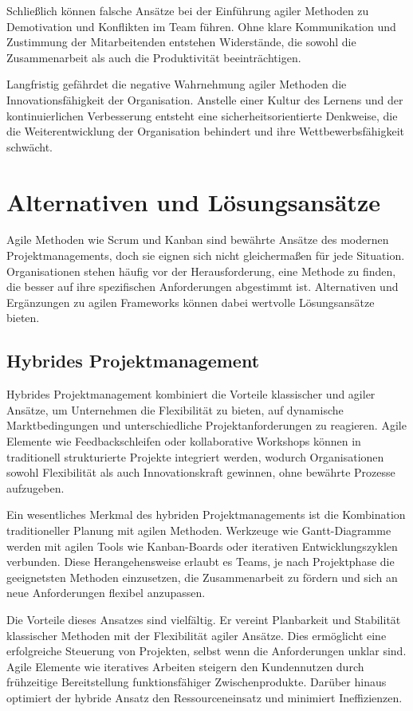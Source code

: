 \documentclass[ngerman]{seminarvorlage}
\begin{document}
Schließlich können falsche Ansätze bei der Einführung agiler Methoden zu Demotivation und Konflikten im Team führen. Ohne klare Kommunikation und Zustimmung der Mitarbeitenden entstehen Widerstände, die sowohl die Zusammenarbeit als auch die Produktivität beeinträchtigen.

Langfristig gefährdet die negative Wahrnehmung agiler Methoden die Innovationsfähigkeit der Organisation. Anstelle einer Kultur des Lernens und der kontinuierlichen Verbesserung entsteht eine sicherheitsorientierte Denkweise, die die Weiterentwicklung der Organisation behindert und ihre Wettbewerbsfähigkeit schwächt.
\cite{stawicki_10_2021}

\section{Alternativen und Lösungsansätze}
Agile Methoden wie Scrum und Kanban sind bewährte Ansätze des modernen Projektmanagements, doch sie eignen sich nicht gleicherma\ss{}en für jede Situation. Organisationen stehen häufig vor der Herausforderung, eine Methode zu finden, die besser auf ihre spezifischen Anforderungen abgestimmt ist. Alternativen und Ergänzungen zu agilen Frameworks können dabei wertvolle Lösungsansätze bieten.

\subsection{Hybrides Projektmanagement}
Hybrides Projektmanagement kombiniert die Vorteile klassischer und agiler Ansätze, um Unternehmen die Flexibilität zu bieten, auf dynamische Marktbedingungen und unterschiedliche Projektanforderungen zu reagieren. Agile Elemente wie Feedbackschleifen oder kollaborative Workshops können in traditionell strukturierte Projekte integriert werden, wodurch Organisationen sowohl Flexibilität als auch Innovationskraft gewinnen, ohne bewährte Prozesse aufzugeben.

Ein wesentliches Merkmal des hybriden Projektmanagements ist die Kombination traditioneller Planung mit agilen Methoden. Werkzeuge wie Gantt-Diagramme werden mit agilen Tools wie Kanban-Boards oder iterativen Entwicklungszyklen verbunden. Diese Herangehensweise erlaubt es Teams, je nach Projektphase die geeignetsten Methoden einzusetzen, die Zusammenarbeit zu fördern und sich an neue Anforderungen flexibel anzupassen.

Die Vorteile dieses Ansatzes sind vielfältig. Er vereint Planbarkeit und Stabilität klassischer Methoden mit der Flexibilität agiler Ansätze. Dies ermöglicht eine erfolgreiche Steuerung von Projekten, selbst wenn die Anforderungen unklar sind. Agile Elemente wie iteratives Arbeiten steigern den Kundennutzen durch frühzeitige Bereitstellung funktionsfähiger Zwischenprodukte. Darüber hinaus optimiert der hybride Ansatz den Ressourceneinsatz und minimiert Ineffizienzen.
\end{document}
